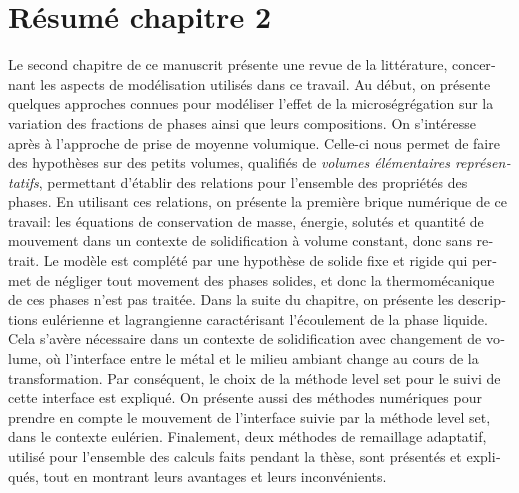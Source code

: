 \clearpage
\section*{Résumé chapitre 2}

\begin{otherlanguage}{french}
{\small
Le second chapitre de ce manuscrit présente une revue de la littérature, concernant les aspects de modélisation utilisés dans ce travail.
Au début, on présente quelques approches connues pour modéliser l'effet de la microségrégation sur la variation des fractions de phases ainsi que leurs compositions.
On s'intéresse après à l'approche de prise de moyenne volumique. Celle-ci nous permet de faire des hypothèses sur des petits volumes, qualifiés de \emph{volumes élémentaires représentatifs},
permettant d'établir des relations pour l'ensemble des propriétés des phases. En utilisant ces relations, on présente la première brique numérique de ce travail: les équations
de conservation de masse, énergie, solutés et quantité de mouvement dans un contexte de solidification à volume constant, donc sans retrait. Le modèle est complété par une hypothèse de 
solide fixe et rigide qui permet de négliger tout movement des phases solides, et donc la thermomécanique de ces phases n'est pas traitée.
Dans la suite du chapitre, on présente les descriptions eulérienne et lagrangienne caractérisant l'écoulement de la phase liquide. 
Cela s'avère nécessaire dans un contexte de solidification avec changement de volume, où l'interface entre le métal et le milieu ambiant change au cours de la transformation.
Par conséquent, le choix de la méthode level set pour le suivi de cette interface est expliqué. On présente aussi des méthodes numériques pour prendre en compte le mouvement
de l'interface suivie par la méthode level set, dans le contexte eulérien. Finalement, deux méthodes de remaillage adaptatif, utilisé pour l'ensemble des calculs faits pendant la thèse,
sont présentés et expliqués, tout en montrant leurs avantages et leurs inconvénients.
}
\end{otherlanguage}